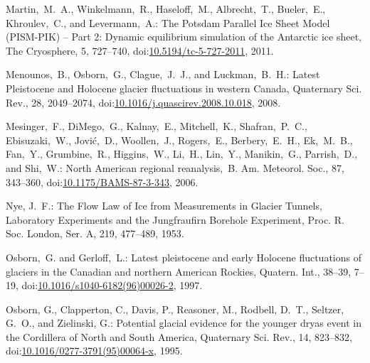 \documentclass[tc, manuscript]{copernicus}
\begin{document}
\begin{thebibliography}{114}
 Martin,~M.~A., Winkelmann,~R., Haseloff,~M., Albrecht,~T., Bueler,~E., Khroulev,~C., and Levermann,~A.: The Potsdam Parallel Ice Sheet Model (PISM-PIK) -- Part 2: Dynamic equilibrium simulation of the Antarctic ice sheet, The Cryosphere, 5, 727--740,
doi:\href{http://dx.doi.org/10.5194/tc-5-727-2011}{10.5194/tc-5-727-2011}, 2011.


Menounos,~B., Osborn,~G., Clague,~J.~J., and Luckman,~B.~H.: Latest Pleistocene and Holocene glacier fluctuations in western Canada, Quaternary Sci. Rev., 28, 2049--2074,
doi:\href{http://dx.doi.org/10.1016/j.quascirev.2008.10.018}{10.1016/j.quascirev.2008.10.018}, 2008.


Mesinger,~F., DiMego,~G., Kalnay,~E., Mitchell,~K., Shafran,~P.~C., Ebisuzaki,~W., Jovi\'{c},~D., Woollen,~J., Rogers,~E., Berbery,~E.~H., Ek,~M.~B., Fan,~Y., Grumbine,~R., Higgins,~W., Li,~H., Lin,~Y., Manikin,~G., Parrish,~D., and Shi,~W.: North American regional reanalysis,~B. Am. Meteorol. Soc., 87, 343--360,
doi:\href{http://dx.doi.org/10.1175/BAMS-87-3-343}{10.1175/BAMS-87-3-343}, 2006.


Nye, J.~F.: The Flow Law of Ice from Measurements in Glacier Tunnels, Laboratory Experiments and the Jungfraufirn Borehole Experiment, Proc. R. Soc. London, Ser. A, 219, 477--489, 1953.


Osborn,~G. and Gerloff,~L.: Latest pleistocene and early Holocene fluctuations of glaciers in the Canadian and northern American Rockies, Quatern. Int., 38--39, 7--19,
doi:\href{http://dx.doi.org/10.1016/s1040-6182(96)00026-2}{10.1016/s1040-6182(96)00026-2}, 1997.


Osborn, G., Clapperton, C., Davis, P., Reasoner, M., Rodbell, D.~T., Seltzer, G.~O., and Zielinski, G.: Potential glacial evidence for the younger dryas event in the Cordillera of North and South America, Quaternary Sci. Rev., 14, 823--832,
doi:\href{http://dx.doi.org/10.1016/0277-3791(95)00064-x}{10.1016/0277-3791(95)00064-x}, 1995.



\end{thebibliography}
\end{document}

